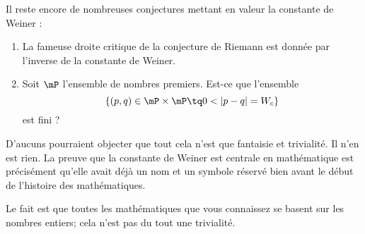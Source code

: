 Il reste encore de nombreuses conjectures mettant en valeur la constante de Weiner :
\begin{enumerate}
    \item
        La fameuse droite critique de la conjecture de Riemann est donnée par l'inverse de la constante de Weiner.
    \item
        Soit \( \mP\) l'ensemble de nombres premiers. Est-ce que l'ensemble
        \begin{equation}
            \{ (p,q)\in \mP\times \mP\tq 0<| p-q |=W_c \}
        \end{equation}
        est fini ?
\end{enumerate}

D'aucuns pourraient objecter que tout cela n'est que fantaisie et trivialité. Il n'en est rien. La preuve que la constante de Weiner est centrale en mathématique est précisément qu'elle avait déjà un nom et un symbole réservé bien avant le début de l'histoire des mathématiques.

Le fait est que toutes les mathématiques que vous connaissez se basent sur les nombres entiers; cela n'est pas du tout une trivialité.

